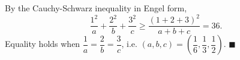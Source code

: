 By the Cauchy-Schwarz inequality in Engel form,
\[
\dfrac{1^2}{a}+\dfrac{2^2}{b}+\dfrac{3^2}{c}\ge\dfrac{(1+2+3)^2}{a+b+c}=36 .
\]
Equality holds when $\dfrac{1}{a}=\dfrac{2}{b}=\dfrac{3}{c}$, i.e. $(a,b,c)=\left(\dfrac{1}{6},\dfrac{1}{3},\dfrac{1}{2}\right)$. $\blacksquare$
